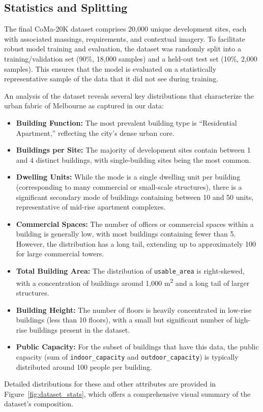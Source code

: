 \subsection{Statistics and Splitting}
  
The final CoMa-20K dataset comprises 20,000 unique development sites, each with associated massings, requirements, and contextual imagery. To facilitate robust model training and evaluation, the dataset was randomly split into a training/validation set (90\%, 18,000 samples) and a held-out test set (10\%, 2,000 samples). This ensures that the model is evaluated on a statistically representative sample of the data that it did not see during training.

An analysis of the dataset reveals several key distributions that characterize the urban fabric of Melbourne as captured in our data:

\begin{itemize}
    \item \textbf{Building Function:} The most prevalent building type is ``Residential Apartment,'' reflecting the city's dense urban core.
    \item \textbf{Buildings per Site:} The majority of development sites contain between 1 and 4 distinct buildings, with single-building sites being the most common.
    \item \textbf{Dwelling Units:} While the mode is a single dwelling unit per building (corresponding to many commercial or small-scale structures), there is a significant secondary mode of buildings containing between 10 and 50 units, representative of mid-rise apartment complexes.
    \item \textbf{Commercial Spaces:} The number of offices or commercial spaces within a building is generally low, with most buildings containing fewer than 5. However, the distribution has a long tail, extending up to approximately 100 for large commercial towers.
    \item \textbf{Total Building Area:} The distribution of \texttt{usable\_area} is right-skewed, with a concentration of buildings around 1,000 m\textsuperscript{2} and a long tail of larger structures.
    \item \textbf{Building Height:} The number of floors is heavily concentrated in low-rise buildings (less than 10 floors), with a small but significant number of high-rise buildings present in the dataset.
    \item \textbf{Public Capacity:} For the subset of buildings that have this data, the public capacity (sum of \texttt{indoor\_capacity} and \texttt{outdoor\_capacity}) is typically distributed around 100 people per building.
\end{itemize}

Detailed distributions for these and other attributes are provided in Figure~\ref{fig:dataset_stats}, which offers a comprehensive visual summary of the dataset's composition.
